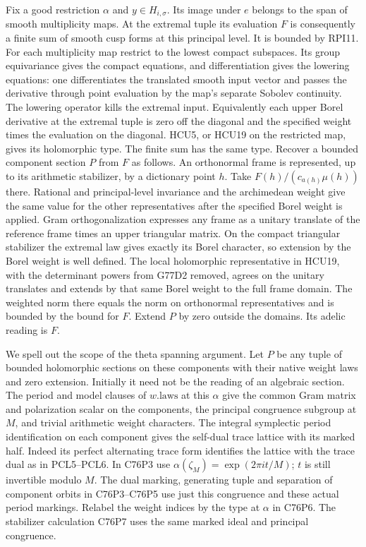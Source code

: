 Fix a good restriction $\alpha$ and $y\in H_{i,\sigma}$.
Its image under $e$ belongs to the span of smooth multiplicity
maps. At the extremal tuple its evaluation $F$ is consequently
a finite sum of smooth cusp forms at this principal level. It
is bounded by RPI11. For each multiplicity map restrict to the
lowest compact subspaces. Its group equivariance gives the compact
equations, and differentiation gives the lowering equations: one
differentiates the translated smooth input vector and passes the
derivative through point evaluation by the map's separate Sobolev
continuity. The lowering operator kills the extremal input.
Equivalently each upper Borel derivative at the extremal tuple is
zero off the diagonal and the specified weight times the evaluation
on the diagonal. HCU5, or HCU19 on the restricted map, gives its
holomorphic type. The finite sum has the same type. Recover
a bounded component section $P$ from $F$ as follows. An
orthonormal frame is represented, up to its arithmetic stabilizer,
by a dictionary point $h$. Take
$F(h)/(c_{a(h)}\mu(h))$ there. Rational and principal-level
invariance and the archimedean weight give the same value for
the other representatives after the specified Borel weight is
applied. Gram orthogonalization expresses any frame as a unitary
translate of the reference frame times an upper triangular matrix.
On the compact triangular stabilizer the extremal law gives
exactly its Borel character, so extension by the Borel weight
is well defined. The local holomorphic representative in HCU19,
with the determinant powers from G77D2 removed, agrees on the
unitary translates and extends by that same Borel weight to the
full frame domain. The weighted norm there equals the norm on
orthonormal representatives and is bounded by the bound for $F$.
Extend $P$ by zero outside the domains. Its adelic reading is $F$.

We spell out the scope of the theta spanning argument. Let $P$
be any tuple of bounded holomorphic sections on these components
with their native weight laws and zero extension. Initially it
need not be the reading of an algebraic section. The period and
model clauses of $w.\mathrm{laws}$ at this $\alpha$ give the common
Gram matrix and polarization scalar on the components, the
principal congruence subgroup at $M$, and trivial arithmetic
weight characters. The integral symplectic period identification
on each component gives the self-dual trace lattice with its
marked half. Indeed its perfect alternating trace form identifies
the lattice with the trace dual as in PCL5--PCL6. In C76P3 use
$\alpha(\zeta_M)=\exp(2\pi i t/M)$; $t$ is still invertible
modulo $M$. The dual marking, generating tuple and separation of
component orbits in C76P3--C76P5 use just this congruence and
these actual period markings. Relabel the weight indices by the
type at $\alpha$ in C76P6. The stabilizer calculation C76P7
uses the same marked ideal and principal congruence.

